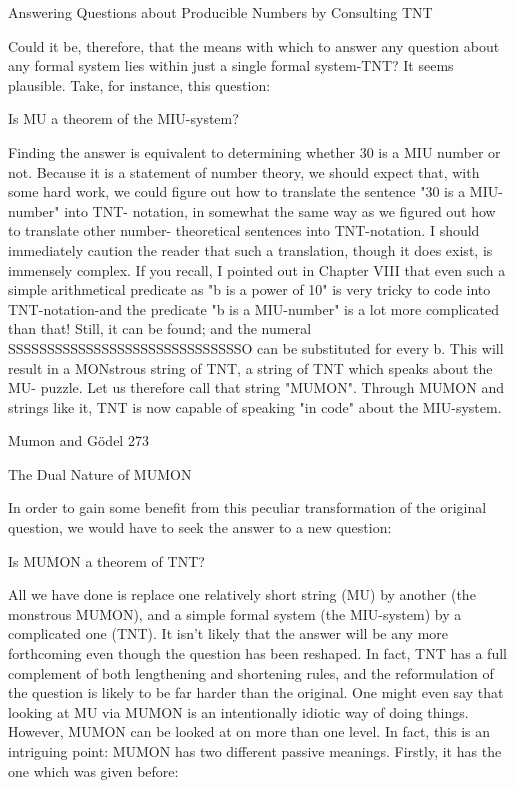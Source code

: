               Answering Questions about Producible Numbers
                          by Consulting TNT

Could it be, therefore, that the means with which to answer any question about any
formal system lies within just a single formal system-TNT? It seems plausible. Take, for
instance, this question:

                          Is MU a theorem of the MIU-system?

Finding the answer is equivalent to determining whether 30 is a MIU number or not.
Because it is a statement of number theory, we should expect that, with some hard work,
we could figure out how to translate the sentence "30 is a MIU-number" into TNT-
notation, in somewhat the same way as we figured out how to translate other number-
theoretical sentences into TNT-notation. I should immediately caution the reader that
such a translation, though it does exist, is immensely complex. If you recall, I pointed out
in Chapter VIII that even such a simple arithmetical predicate as "b is a power of 10" is
very tricky to code into TNT-notation-and the predicate "b is a MIU-number" is a lot
more complicated than that! Still, it can be found; and the numeral
SSSSSSSSSSSSSSSSSSSSSSSSSSSSSSO can be substituted for every b. This will
result in a MONstrous string of TNT, a string of TNT which speaks about the MU-
puzzle. Let us therefore call that string "MUMON". Through MUMON and strings like
it, TNT is now capable of speaking "in code" about the MIU-system.




Mumon and Gödel                                                                         273

                           The Dual Nature of MUMON

In order to gain some benefit from this peculiar transformation of the original question,
we would have to seek the answer to a new question:

                            Is MUMON a theorem of TNT?

All we have done is replace one relatively short string (MU) by another (the monstrous
MUMON), and a simple formal system (the MIU-system) by a complicated one (TNT).
It isn't likely that the answer will be any more forthcoming even though the question has
been reshaped. In fact, TNT has a full complement of both lengthening and shortening
rules, and the reformulation of the question is likely to be far harder than the original.
One might even say that looking at MU via MUMON is an intentionally idiotic way of
doing things. However, MUMON can be looked at on more than one level.
          In fact, this is an intriguing point: MUMON has two different passive meanings.
Firstly, it has the one which was given before:

